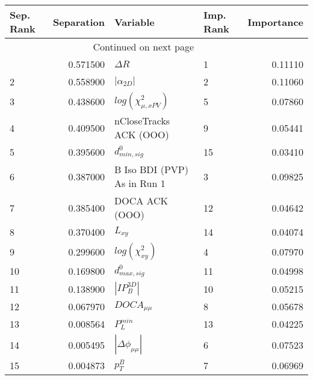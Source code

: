\usepackage{lscape}

\begin{landscape}
\begin{longtable}{lrllr}
\toprule
Sep. Rank &  Separation &                     Variable & Imp. Rank &  Importance \\
\midrule
\endhead
\midrule
\multicolumn{3}{r}{{Continued on next page}} \\
\midrule
\endfoot

\bottomrule
\endlastfoot
        1 &    0.571500 &                   $\Delta R$ &         1 &     0.11110 \\
        2 &    0.558900 &              $|\alpha_{2D}|$ &         2 &     0.11060 \\
        3 &    0.438600 &    $log(\chi^{2}_{\mu,xPV})$ &         5 &     0.07860 \\
        4 &    0.409500 &       nCloseTracks ACK (OOO) &         9 &     0.05441 \\
        5 &    0.395600 &             $d^0_{min, sig}$ &        15 &     0.03410 \\
        6 &    0.387000 &  B Iso BDI (PVP) As in Run 1 &         3 &     0.09825 \\
        7 &    0.385400 &               DOCA ACK (OOO) &        12 &     0.04642 \\
        8 &    0.370400 &                     $L_{xy}$ &        14 &     0.04074 \\
        9 &    0.299600 &         $log(\chi^{2}_{xy})$ &         4 &     0.07970 \\
       10 &    0.169800 &             $d^0_{max, sig}$ &        11 &     0.04998 \\
       11 &    0.138900 &              $|IP_{B}^{3D}|$ &        10 &     0.05215 \\
       12 &    0.067970 &              $DOCA_{\mu\mu}$ &         8 &     0.05678 \\
       13 &    0.008564 &                $P^{min}_{L}$ &        13 &     0.04225 \\
       14 &    0.005495 &     $|\Delta \phi_{\mu\mu}|$ &         6 &     0.07523 \\
       15 &    0.004873 &                    $p^B_{T}$ &         7 &     0.06969 \\
\end{longtable}

\end{landscape}
